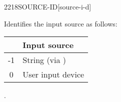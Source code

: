 \begin{worddef}{2218}{SOURCE-ID}[source-i-d]
\item {}

	Identifies the input source as follows:
	\begin{center}
		\begin{tabular}{cl}
		\hline\hline
		\word{SOURCE-ID} & Input source \\
		\hline
		-1	& String (via \word{EVALUATE}) \\
		 0	& User input device \\
		\hline\hline
		\end{tabular}
	\end{center}

\see {}.
\end{worddef}


%
%


%
%
%
%


